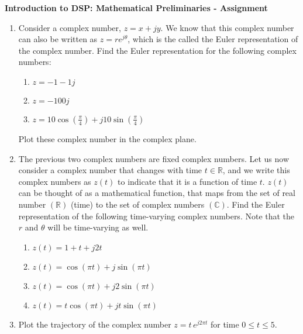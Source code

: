 \documentclass[9pt]{article}
\begin{document}
\begin{center}
    \begin{Large}
        \textbf{Introduction to DSP: Mathematical Preliminaries - Assignment}
    \end{Large}
\end{center}
\vspace{0.2cm}

\begin{multicols}{2}
    \begin{enumerate}
        \item  Consider a complex number, $z = x + jy$. We know that this complex number can also be written as $z = {re}^{j\theta}$, which is the called the Euler representation of the complex number. Find the Euler representation for the following complex numbers:
        \begin{enumerate}
            \item $z = -1 - 1j$
            \item $z = - 100j$
            \item $z = 10\cos(\frac{\pi}{4}) + j10\sin(\frac{\pi}{4})$
        \end{enumerate}

        Plot these complex number in the complex plane.

        \item The previous two complex numbers are fixed complex numbers. Let us now consider a complex number that changes with time $t \in \mathbb{R}$, and we write this complex numbers as $z(t)$ to indicate that it is a function of time $t$. $z(t)$ can be thought of as a mathematical function, that maps from the set of real number $(\mathbb{R})$ (time) to the set of complex numbers $(\mathbb{C})$. Find the Euler representation of the following time-varying complex numbers. Note that the $r$ and $\theta$ will be time-varying as well.
        \begin{enumerate}
            \item $z(t) = 1 + t + j2t$
            \item $z(t) = \cos(\pi t) + j\sin(\pi t)$
            \item $z(t) = \cos(\pi t) + j2\sin(\pi t)$
            \item $z(t) = t\cos(\pi t) + jt\sin(\pi t)$
        \end{enumerate}

        \item Plot the trajectory of the complex number $z = t\,e^{j2\pi t}$ for time $0 \leq t \leq 5$.


\end{enumerate}
\end{multicols}
\end{document}
